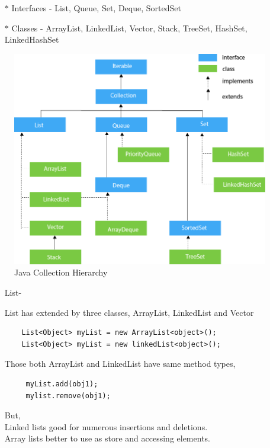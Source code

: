 \documentclass[12pt,a4paper]{report}
\begin{document}
\begin{itemize}
	\item[$\ast$] Interfaces - List, Queue, Set, Deque, SortedSet
    \item[$\ast$] Classes - ArrayList, LinkedList, Vector, Stack, TreeSet, HashSet, LinkedHashSet
    
\end{itemize}

\begin{figure}[H]
\includegraphics[scale=.5]{JavaCollection.png}
  \caption{Java Collection Hierarchy}
  \label{fig:javaCollection}
\end{figure}
  
\begin{itemize}
	\item [List-]
	
	List has extended by three classes, ArrayList, LinkedList and Vector\\
	\begin{lstlisting}
	List<Object> myList = new ArrayList<object>();
	List<Object> myList = new linkedList<object>();
   \end{lstlisting}
	 Those both ArrayList and LinkedList have same method types,\\
	 \begin{lstlisting}
	 myList.add(obj1);
	 mylist.remove(obj1);
	 \end{lstlisting}
	 

But,\\ Linked lists good for numerous insertions and deletions.\\
Array lists better to use as store and accessing elements.
	
	
\end{itemize}
\end{document}
